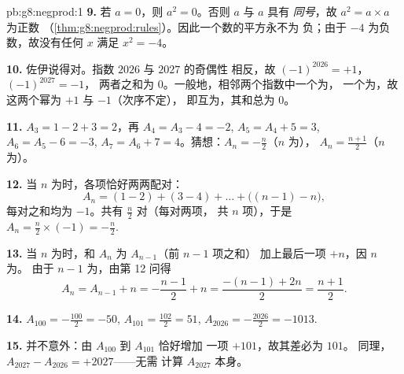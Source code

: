 \begin{solution}{pb:g8:negprod:1}
\textbf{9.} 若 $a = 0$，则 $a^2 = 0$。否则 $a$ 与 $a$ 具有
\emph{同号}，故 $a^2 = a \times a$ 为正数
（\cref{thm:g8:negprod:rules}）。因此一个数的平方永不为
负；由于 $-4$ 为负数，故没有任何 $x$ 满足
$x^2 = -4$。

\textbf{10.} 佐伊说得对。指数 $2026$ 与 $2027$ 的奇偶性
相反，故 $(-1)^{2026} = +1$，$(-1)^{2027} = -1$，
两者之和为 $0$。一般地，相邻两个指数中一个为，
一个为，故这两个幂为 $+1$ 与 $-1$（次序不定），
即互为，其和总为 $0$。

\textbf{11.} $A_3 = 1 - 2 + 3 = 2$，再
$A_4 = A_3 - 4 = -2$, $A_5 = A_4 + 5 = 3$, $A_6 = A_5 - 6 = -3$,
$A_7 = A_6 + 7 = 4$。猜想：$A_n = -\frac{n}{2}$（$n$ 为），
$A_n = \frac{n+1}{2}$（$n$ 为）。

\textbf{12.} 当 $n$ 为时，各项恰好两两配对：
\[
A_n = (1 - 2) + (3 - 4) + \dots + \bigl((n-1) - n\bigr),
\]
每对之和均为 $-1$。共有 $\frac{n}{2}$ 对（每对两项，
共 $n$ 项），于是
$A_n = \frac{n}{2} \times (-1) = -\frac{n}{2}$.

\textbf{13.} 当 $n$ 为时，和 $A_n$ 为 $A_{n-1}$（前 $n - 1$ 项之和）
加上最后一项 $+n$，因 $n$ 为。
由于 $n - 1$ 为，由第 12 问得
\[
A_n = A_{n-1} + n = -\frac{n-1}{2} + n
= \frac{-(n-1) + 2n}{2} = \frac{n+1}{2} .
\]

\textbf{14.} $A_{100} = -\frac{100}{2} = -50$, \quad
$A_{101} = \frac{102}{2} = 51$, \quad
$A_{2026} = -\frac{2026}{2} = -1013$.

\textbf{15.} 并不意外：由 $A_{100}$ 到 $A_{101}$ 恰好增加
一项 $+101$，故其差必为 $101$。
同理，$A_{2027} - A_{2026} = +2027$——无需
计算 $A_{2027}$ 本身。
\end{solution}
